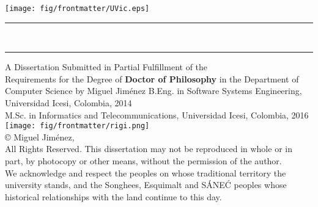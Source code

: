 \thispagestyle{empty}

\begingroup%
	\begin{center}
		\texttt{[image: fig/frontmatter/UVic.eps]}
		\vfill
		\hrule
		\vspace{0.8cm}
		{\Huge\bfseries \thesistitle \\}
		\vspace{2cm}
		\hrule
		\vfill
		{A Dissertation Submitted in Partial Fulfillment of the\\Requirements for the Degree of \mylinebreak}
		{\Large\bfseries Doctor of Philosophy \mylinebreak}
		in the Department of Computer Science \mylinebreak
		{by \mylinebreak}
		{\Large Miguel Jim\'{e}nez \mylinebreak}
		{B.Eng. in Software Systems Engineering, Universidad Icesi, Colombia, 2014 \\
			M.Sc. in Informatics and Telecommunications, Universidad Icesi, Colombia, 2016 \\}
		\vfill
		\texttt{[image: fig/frontmatter/rigi.png]}\\
		\copyright{} Miguel Jim\'{e}nez, \the\year{}\\[3em]
		{\footnotesize All Rights Reserved. This dissertation may not be reproduced in whole or in part, by photocopy or other means, without the permission of the author.\\[0.5em]}
		{\footnotesize We acknowledge and respect the \lekwungen{} peoples on whose traditional territory the university stands, and the Songhees, Esquimalt and S\'{A}NE\'{C} peoples whose historical relationships with the land continue to this day.}
	\end{center}
\endgroup

\clearpage
